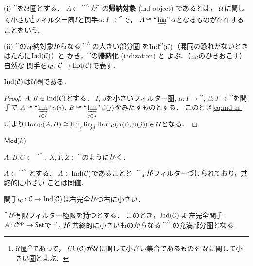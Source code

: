\begin{Definition}
    (i) 
    $\cat$を$\mathcal{U}$圏とする．
    $A\in\cat^\wedge$が$\cat$の\textbf{帰納対象} (ind-object) であるとは，
    $\mathcal{U}$に関して小さい\footnote{
        $\mathcal{U}$圏$\cat$であって，
        $\mathop{\textrm{Ob}}\nolimits(\mathcal{C})$が$\mathcal{U}$に関して小さい集合であるものを
        $\mathcal{U}$に関して小さい圏とよぶ．
    }フィルター圏$I$と関手$\alpha\colon I\to\cat$で，
    $A\cong\mathop{\text{``}\hspace{-0.7pt}\varinjlim\hspace{-1.5pt}\text{''}}\alpha$となるものが存在することをいう．

    (ii) 
    $\cat$の帰納対象からなる$\cat^\wedge$の大きい部分圏
    を$\mathop{\mathrm{Ind}}^\mathcal{U}(\mathcal{C})$（混同の恐れがないときはたんに$\mathop{\mathrm{Ind}}(\mathcal{C})$）と
    かき，$\cat$の\textbf{帰納化} (indization) と
    よぶ．（$\mathop{\mathrm{h}}\nolimits_{\mathcal{C}}$のひきおこす）自然な
    関手を$\iota_{\mathcal{C}}\colon\mathcal{C}\to\mathop{\mathrm{Ind}}(\mathcal{C})$で表す．
\end{Definition}

\begin{Lemma}
    $\mathop{\mathrm{Ind}}(\mathcal{C})$は$\mathcal{U}$圏である．
\end{Lemma}
\begin{proof}
    $A,B\in\mathop{\mathrm{Ind}}(\mathcal{C})$とする．
    $I$, $J$を小さいフィルター圏, 
    $\alpha\colon I\to\cat$, $\beta\colon J\to\cat$を関手で
    $A\cong\ind<\varinjlim_{i\in I}>\alpha(i)$, 
    $B\cong\ind<\varinjlim_{j\in J}>\beta(j)$をみたすものとする．
    このとき\eqref{eq:ind-in-U}より$\mathop{\mathrm{Hom}}\nolimits_{\mathcal{C}}(A,B)\cong\varprojlim_i\varinjlim_j\mathop{\mathrm{Hom}}\nolimits_{\mathcal{C}}(\alpha(i),\beta(j))\in\mathcal{U}$となる．
\end{proof}

\begin{Example}
    $\mathop{\textsf{Mod}}\nolimits(k)$
\end{Example}

\begin{Notation}
    $A,B,C\in\cat^\wedge$, $X,Y,Z\in\cat$のようにかく．
\end{Notation}

\begin{Proposition}
    $A\in\cat^\wedge$とする．
    $A\in\mathop{\mathrm{Ind}}(\mathcal{C})$であることと
    $\cat_A$がフィルターづけられており，共終的に小さい
    ことは同値．
\end{Proposition}

\begin{Corollary}
    関手$\iota_{\mathcal{C}}\colon\mathcal{C}\to\mathop{\mathrm{Ind}}(\mathcal{C})$は右完全かつ右に小さい．
\end{Corollary}

\begin{Proposition}\label{prop:ind-full}
    $\cat$が有限フィルター極限を持つとする．
    このとき，$\mathop{\mathrm{Ind}}(\mathcal{C})$は
    左完全関手$A\colon\mathcal{C}^{\rm op}\to\mathop{\textsf{Set}}\nolimits$で$\cat_A$が
    共終的に小さいものからなる$\cat^\wedge$の充満部分圏となる．
\end{Proposition}








